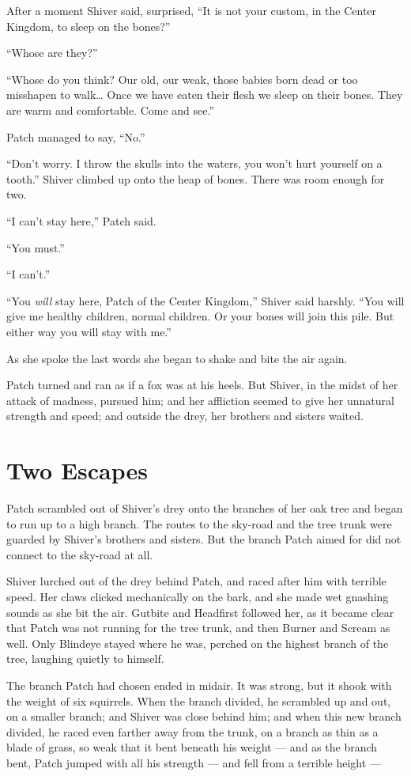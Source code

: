 \documentclass[ebook,oneside,openany,12pt]{memoir}
\begin{document}
After a moment Shiver said, surprised, “It is not your custom, in the
Center Kingdom, to sleep on the bones?”

“Whose are they?”

“Whose do you think? Our old, our weak, those babies born dead or too
misshapen to walk… Once we have eaten their flesh we sleep on their
bones. They are warm and comfortable. Come and see.”

Patch managed to say, “No.”

“Don’t worry. I throw the skulls into the waters, you won’t hurt
yourself on a tooth.” Shiver climbed up onto the heap of bones. There
was room enough for two.

“I can’t stay here,” Patch said.

“You must.”

“I can’t.”

“You \emph{will} stay here, Patch of the Center Kingdom,” Shiver
said harshly. “You will give me healthy children, normal children. Or
your bones will join this pile. But either way you will stay with me.”

As she spoke the last words she began to shake and bite the air again.

Patch turned and ran as if a fox was at his heels. But Shiver, in the
midst of her attack of madness, pursued him; and her affliction seemed
to give her unnatural strength and speed; and outside the drey, her
brothers and sisters waited.


\section{Two Escapes}

Patch scrambled out of Shiver’s drey onto the branches of her oak tree
and began to run up to a high branch. The routes to the sky-road and
the tree trunk were guarded by Shiver’s brothers and sisters. But the
branch Patch aimed for did not connect to the sky-road at all.

Shiver lurched out of the drey behind Patch, and raced after him with
terrible speed. Her claws clicked mechanically on the bark, and she
made wet gnashing sounds as she bit the air. Gutbite and Headfirst
followed her, as it became clear that Patch was not running for the
tree trunk, and then Burner and Scream as well. Only Blindeye stayed
where he was, perched on the highest branch of the tree, laughing
quietly to himself.

The branch Patch had chosen ended in midair. It was strong, but it
shook with the weight of six squirrels. When the branch divided, he
scrambled up and out, on a smaller branch; and Shiver was close behind
him; and when this new branch divided, he raced even farther away from
the trunk, on a branch as thin as a blade of grass, so weak that it
bent beneath his weight — and as the branch bent, Patch jumped with
all his strength — and fell from a terrible height —
\end{document}
